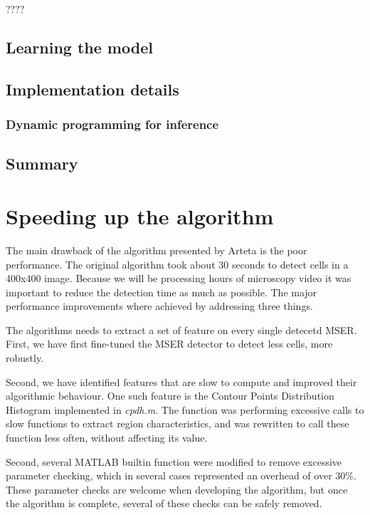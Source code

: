 		????
		
		\subsection{Learning the model }
			

		\subsection{Implementation details }
			\subsubsection{Dynamic programming for inference }
		\subsection{Summary }
		
	\section{Speeding up the algorithm }
	The main drawback of the algorithm presented by Arteta \cite{arteta12} is the poor performance. The original algorithm took about 30 seconds to detect cells in a 400x400 image. Because we will be processing hours of microscopy video it was important to reduce the detection time as much as possible.  The major performance improvements where achieved by addressing three things.
	
	The algorithms needs to extract a set of feature on every single detecetd MSER. First, we have first fine-tuned the MSER detector to detect less cells, more robustly.
	
	Second, we have identified features that are slow to compute and improved their algorithmic behaviour. One such feature is the Contour Points Distribution Histogram implemented in \textit{cpdh.m}. The function was performing excessive calls to slow functions to extract region characteristics, and was rewritten to call these function less often, without affecting its value.
	
	Second, several MATLAB builtin function were modified to remove excessive parameter checking, which in several cases represented an overhead of over $30\%$. These parameter checks are welcome when developing the algorithm, but once the algorithm is complete, several of these checks can be safely removed. 
	
